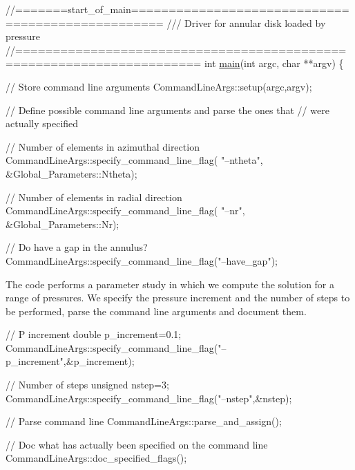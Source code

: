  
\begin{DoxyCodeInclude}
\textcolor{comment}{//=======start\_of\_main==================================================}
\textcolor{comment}{/// Driver for annular disk loaded by pressure}
\textcolor{comment}{}\textcolor{comment}{//======================================================================}
\textcolor{keywordtype}{int} \hyperlink{time__harmonic__elastic__annulus_8cc_a3c04138a5bfe5d72780bb7e82a18e627}{main}(\textcolor{keywordtype}{int} argc, \textcolor{keywordtype}{char} **argv)
\{

 \textcolor{comment}{// Store command line arguments}
 CommandLineArgs::setup(argc,argv);

 \textcolor{comment}{// Define possible command line arguments and parse the ones that}
 \textcolor{comment}{// were actually specified}
 
 \textcolor{comment}{// Number of elements in azimuthal direction}
 CommandLineArgs::specify\_command\_line\_flag(
  \textcolor{stringliteral}{"--ntheta"},
  &Global\_Parameters::Ntheta);

 \textcolor{comment}{// Number of elements in radial direction}
 CommandLineArgs::specify\_command\_line\_flag(
  \textcolor{stringliteral}{"--nr"},
  &Global\_Parameters::Nr);
 
 \textcolor{comment}{// Do have a gap in the annulus?}
 CommandLineArgs::specify\_command\_line\_flag(\textcolor{stringliteral}{"--have\_gap"});

\end{DoxyCodeInclude}


The code performs a parameter study in which we compute the solution for a range of pressures. We specify the pressure increment and the number of steps to be performed, parse the command line arguments and document them.


\begin{DoxyCodeInclude}
 \textcolor{comment}{// P increment}
 \textcolor{keywordtype}{double} p\_increment=0.1;
 CommandLineArgs::specify\_command\_line\_flag(\textcolor{stringliteral}{"--p\_increment"},&p\_increment);
 
 \textcolor{comment}{// Number of steps}
 \textcolor{keywordtype}{unsigned} nstep=3; 
 CommandLineArgs::specify\_command\_line\_flag(\textcolor{stringliteral}{"--nstep"},&nstep);
 
 \textcolor{comment}{// Parse command line}
 CommandLineArgs::parse\_and\_assign(); 
 
 \textcolor{comment}{// Doc what has actually been specified on the command line}
 CommandLineArgs::doc\_specified\_flags();

\end{DoxyCodeInclude}


